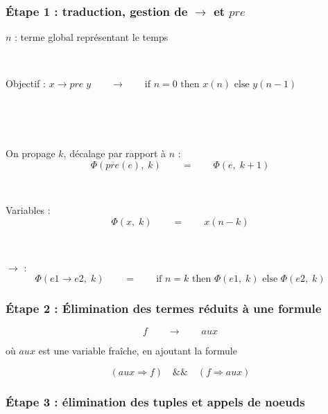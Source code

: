 \documentclass[18pt]{beamer}
\begin{document}
\begin{frame}
\frametitle{Étape 1 : traduction, gestion de $\rightarrow$ et $pre$}
	
	$n$ : terme global représentant le temps
	
	\
	
	Objectif : \qquad $x\rightarrow pre \; y \qquad\longrightarrow\qquad \text{if }n=0 \text{ then } x(n) \text{ else } y(n-1)$
	
	\
	
	\
	
	On propage $k$, décalage par rapport à $n$ :
	\vspace{-1em}
	$$\Phi(pre(e),\;k) \qquad=\qquad \Phi(e,\;k+1)$$
	
	\
	
	Variables :
	\vspace{-1em}
	$$\Phi(x,\;k) \qquad=\qquad x(n-k)$$
	
	\
	
	$\rightarrow$ :
	\vspace{-1em}
	$$\Phi(e1\rightarrow e2, \;k) \qquad=\qquad \text{if }n=k \text{ then } \Phi(e1,\;k) \text{ else } \Phi(e2,\;k)$$
	
\end{frame}
\begin{frame}
\frametitle{Étape 2 :
Élimination des termes réduits à une formule}
	
	$$f \qquad\longrightarrow\qquad aux$$

	où $aux$ est une variable fraîche, en ajoutant la formule
	
	$$(aux \Rightarrow f) \quad \&\& \quad (f \Rightarrow aux)$$
	
	
\end{frame}
\begin{frame}
\frametitle{Étape 3 :
élimination des tuples et appels de noeuds}
	
\end{frame}
\end{document}
